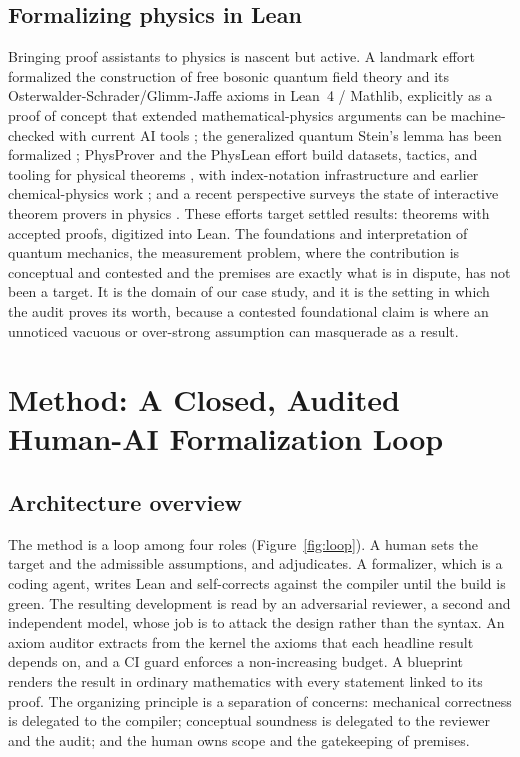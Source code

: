 \documentclass[11pt]{article}
\begin{document}
\subsection{Formalizing physics in Lean}

Bringing proof assistants to physics is nascent but active. A landmark effort formalized the
construction of free bosonic quantum field theory and its Osterwalder-Schrader/Glimm-Jaffe axioms
in Lean~4 / Mathlib, explicitly as a proof of concept that extended mathematical-physics arguments
can be machine-checked with current AI tools \cite{r24}; the generalized quantum Stein's lemma has
been formalized \cite{r25}; PhysProver and the PhysLean effort build datasets, tactics, and tooling
for physical theorems \cite{r26,r27}, with index-notation infrastructure \cite{r28} and earlier
chemical-physics work \cite{r29}; and a recent perspective surveys the state of interactive theorem
provers in physics \cite{r30}. These efforts target settled results: theorems with accepted proofs,
digitized into Lean. The foundations and interpretation of quantum mechanics, the measurement
problem, where the contribution is conceptual and contested and the premises are exactly what is in
dispute, has not been a target. It is the domain of our case study, and it is the setting in which
the audit proves its worth, because a contested foundational claim is where an unnoticed vacuous or
over-strong assumption can masquerade as a result.

\section{Method: A Closed, Audited Human-AI Formalization Loop}

\subsection{Architecture overview}

The method is a loop among four roles (Figure~\ref{fig:loop}). A human sets the target and the
admissible assumptions, and adjudicates. A formalizer, which is a coding agent, writes Lean and
self-corrects against the compiler until the build is green. The resulting development is read by an
adversarial reviewer, a second and independent model, whose job is to attack the design rather than
the syntax. An axiom auditor extracts from the kernel the axioms that each headline result depends
on, and a CI guard enforces a non-increasing budget. A blueprint renders the result in ordinary
mathematics with every statement linked to its proof. The organizing principle is a separation of
concerns: mechanical correctness is delegated to the compiler; conceptual soundness is delegated to
the reviewer and the audit; and the human owns scope and the gatekeeping of premises.
\end{document}
